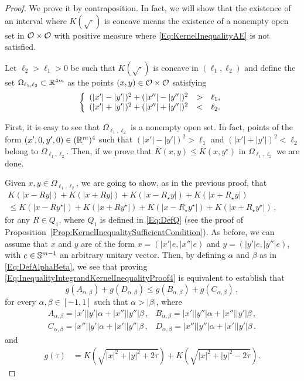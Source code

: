 \begin{proof}
We prove it by contraposition. In fact, we will show that the existence of an interval where $K(\sqrt{\cdot})$ is concave means the existence of a nonempty open set in $\mathcal{O} \times \mathcal{O}$ with positive measure where \eqref{Eq:KernelInequalityAE} is not satisfied.

Let $\ell_2>\ell_1>0$ be such that $K(\sqrt{\cdot})$ is concave in $(\ell_1,\ell_2)$ and define the set $\Omega_{\ell_1,\ell_2}\subset \mathbb{R}^{4m}$ as the points $(x,y)\in \mathcal{O}\times \mathcal{O}$ satisfying
\begin{equation}
\label{Eq:OmegaSetDefinition}
\left\{\begin{array}{rcll}
(|x'|-|y'|)^2+(|x''|-|y''|)^2&>&\ell_1,\\
(|x'|+|y'|)^2+(|x''|+|y''|)^2&<&\ell_2.
\end{array} \right.
\end{equation}

First, it is easy to see that $\Omega_{\ell_1,\ell_2}$ is a nonempty open set. In fact, points of the form $(x',0,y',0)\in (\mathbb{R}^m)^4$ such that $(|x'|-|y'|)^2>\ell_1$ and $(|x'|+|y'|)^2 <\ell_2$ belong to $\Omega_{\ell_1,\ell_2}$. Then, if we prove that $\overline{K}(x,y) \leq \overline{K}(x, y^\star)$ in $\Omega_{\ell_1,\ell_2}$ we are done.

Given $x,y\in \Omega_{\ell_1,\ell_2}$, we are going to show, as in the previous proof, that
\begin{equation}
\label{Eq:InequalityIntegrandKernelInequalityProof4}
\begin{split}
K(|x - R y|) + K(|x + R y|) + K(|x - R_\star y|) + K(|x + R_\star y|)
\quad \quad \quad \quad \quad \quad
\\
\leq
K(|x - R y^\star|) + K(|x + R y^\star|)+K(|x - R_\star y^\star|) + K(|x + R_\star y^\star|)\,, 
\end{split}
\end{equation}
for any $R\in Q_1$, where $Q_1$ is defined in \eqref{Eq:DefQ} (see the proof of Proposition~\ref{Prop:KernelInequalitySufficientCondition}). As before, we can assume that $x$ and $y$ are of the form $x = (|x'|e, |x''|e)$ and $y = (|y'|e, |y''|e)$, with $e \in \mathbb{S}^{m-1}$ an arbitrary unitary vector. Then, by defining $\alpha$ and $\beta$ as in \eqref{Eq:DefAlphaBeta}, we see that proving \eqref{Eq:InequalityIntegrandKernelInequalityProof4} is equivalent to establish that
\begin{equation}
\label{Eq:InequalityIntegrandKernelInequalityProof5}
g(A_{\alpha,\beta}) + g(D_{\alpha,\beta}) \leq g(B_{\alpha,\beta}) + g(C_{\alpha,\beta})\,,
\end{equation}
for every $\alpha, \beta \in [-1,1]$ such that $\alpha>|\beta|$, where
$$
\begin{array}{cc}
A_{\alpha,\beta} = |x'||y'|  \alpha + |x''||y''|\beta \,, &
B_{\alpha,\beta} = |x'||y''| \alpha + |x''||y'| \beta \,, \\
C_{\alpha,\beta} = |x''||y'| \alpha + |x'||y''| \beta \,, &
D_{\alpha,\beta} = |x''||y''|\alpha + |x'||y'|  \beta \,.
\end{array}
$$
and
\begin{align*}
g(\tau) &= K\left( \sqrt{|x|^2+|y|^2+2\tau} \right) + K\left( \sqrt{|x|^2+|y|^2-2\tau} \right).
\end{align*}





\end{proof}
